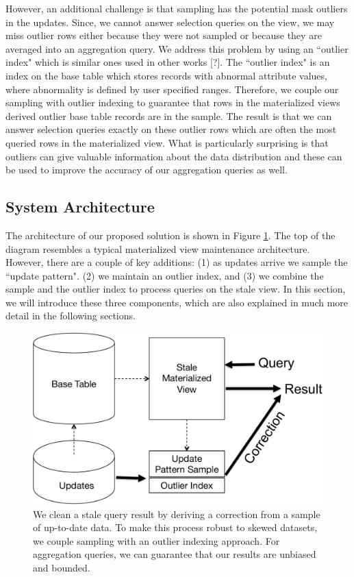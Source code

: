 However, an additional challenge is that sampling has the potential mask outliers in the updates.
Since, we cannot answer selection queries on the view, we may miss outlier rows either because they were not sampled or because
they are averaged into an aggregation query.
We address this problem by using an ``outlier index" which is similar ones used in other works [?].
The ``outlier index" is an index on the base table which stores records with abnormal attribute values, where abnormality is defined by user specified ranges.
Therefore, we couple our sampling with outlier indexing to guarantee that rows in the materialized views derived outlier base table records are in the sample.
The result is that we can answer selection queries exactly on these outlier rows which are often the most queried rows in the materialized view.
What is particularly surprising is that outliers can give valuable information about the data distribution and these can be used to improve the accuracy of our aggregation queries as well.

\subsection{System Architecture}
The architecture of our proposed solution is shown in Figure \ref{sys-arch}.
The top of the diagram resembles a typical materialized 
view maintenance architecture.
However, there are a couple of key additions: (1) as updates arrive we sample the ``update pattern". 
(2) we maintain an outlier index, and (3) we combine the sample and the outlier index to process queries on the stale view.
In this section, we will introduce these three components, which are also explained in much more detail in the following sections.

\begin{figure}[h]
\label{sys-arch}
\centering
 \includegraphics[width=\columnwidth]{figs/sys-arch.pdf}
 \caption{We clean a stale query result by deriving a correction from a sample of up-to-date data. To make this process robust to skewed datasets, we couple sampling with an outlier indexing approach. For aggregation queries, we can guarantee that our results are unbiased and bounded.}
\end{figure}


